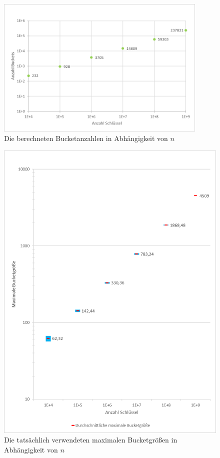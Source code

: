 \documentclass[a4paper,12pt,twoside]{report}
\begin{document}
\begin{figure}[tbhp]
\centering
\includegraphics[width=0.9\textwidth]{diagrams/AnzahlBuckets.png}
\caption{Die berechneten Bucketanzahlen in Abhängigkeit von $n$}
\label{img:AnzahlBuckets}
\end{figure}
\begin{figure}[tbhp]
\centering
\includegraphics[width=\textwidth]{diagrams/MaximaleBucketgroesse.png} 
\caption{Die tatsächlich verwendeten maximalen Bucketgrößen in Abhängigkeit von $n$}
\label{img:MaximaleBucketgroesse}
\end{figure}
\end{document}
